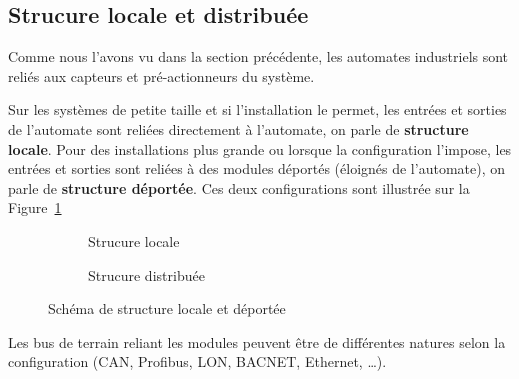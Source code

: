 \subsection{Strucure locale et distribuée}
Comme nous l'avons vu dans la section précédente, les automates industriels sont reliés aux capteurs et pré-actionneurs du système.

Sur les systèmes de petite taille et si l'installation le permet, les entrées et sorties de l'automate sont reliées directement à l'automate, on parle de \textbf{structure locale}. Pour des installations plus grande ou lorsque la configuration l'impose, les entrées et sorties sont reliées à des modules déportés (éloignés de l'automate), on parle de \textbf{structure déportée}. Ces deux configurations sont illustrée sur la Figure~\ref{fig:local_deporte}

\begin{figure}[h]
	\begin{subfigure}[b]{.49\textwidth}
		\centering
		
		\caption{Strucure locale}
	\end{subfigure}
	\begin{subfigure}[b]{.49\textwidth}
	\centering
	
	\caption{Strucure distribuée}
	\end{subfigure}
	\caption{Schéma de structure locale et déportée}
	\label{fig:local_deporte}
\end{figure}

Les bus de terrain reliant les modules peuvent être de différentes natures selon la configuration (CAN, Profibus, LON, BACNET, Ethernet, \dots).


